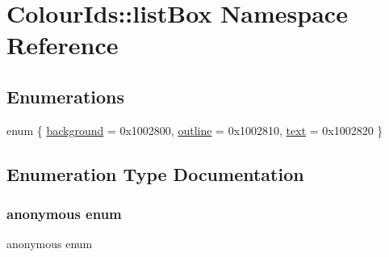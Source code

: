 \hypertarget{namespaceColourIds_1_1listBox}{}\section{Colour\+Ids\+:\+:list\+Box Namespace Reference}
\label{namespaceColourIds_1_1listBox}
\subsection*{Enumerations}
\begin{DoxyCompactItemize}
\item 
enum \{ \mbox{\hyperlink{namespaceColourIds_1_1listBox_a1d106a171cab982e2c9d652990b5fdeeadf8097663e01931ae45c95d28be0803f}{background}} = 0x1002800, 
\mbox{\hyperlink{namespaceColourIds_1_1listBox_a1d106a171cab982e2c9d652990b5fdeeabb2ae92bce120d44dfb2d36695fda978}{outline}} = 0x1002810, 
\mbox{\hyperlink{namespaceColourIds_1_1listBox_a1d106a171cab982e2c9d652990b5fdeea5cb8ec45ca52cd247d05fa621ca12159}{text}} = 0x1002820
 \}
\end{DoxyCompactItemize}


\subsection{Enumeration Type Documentation}
\mbox{\label{namespaceColourIds_1_1listBox_a1d106a171cab982e2c9d652990b5fdee}} 
\subsubsection{\texorpdfstring{anonymous enum}{anonymous enum}}
{\footnotesize\ttfamily anonymous enum}

